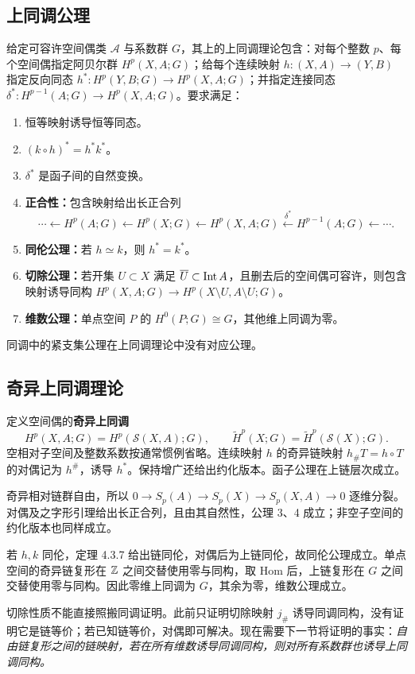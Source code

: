 \subsection*{上同调公理}
给定可容许空间偶类 $\mathcal A$ 与系数群 $G$，其上的上同调理论包含：对每个整数 $p$、每个空间偶指定阿贝尔群 $H^p(X,A;G)$；给每个连续映射 $h:(X,A)\to(Y,B)$ 指定反向同态 $h^*:H^p(Y,B;G)\to H^p(X,A;G)$；并指定连接同态 $\delta^*:H^{p-1}(A;G)\to H^p(X,A;G)$。要求满足：
\begin{enumerate}[label=公理 \arabic*.]
\item 恒等映射诱导恒等同态。
\item $(k\circ h)^*=h^*k^*$。
\item $\delta^*$ 是函子间的自然变换。
\item \textbf{正合性：}包含映射给出长正合列
\[
\cdots\leftarrow H^p(A;G)\leftarrow H^p(X;G)\leftarrow H^p(X,A;G)
\xleftarrow{\delta^*}H^{p-1}(A;G)\leftarrow\cdots.
\]
\item \textbf{同伦公理：}若 $h\simeq k$，则 $h^*=k^*$。
\item \textbf{切除公理：}若开集 $U\subset X$ 满足 $\overline U\subset\operatorname{Int} A$，且删去后的空间偶可容许，则包含映射诱导同构 $H^p(X,A;G)\to H^p(X\setminus U,A\setminus U;G)$。
\item \textbf{维数公理：}单点空间 $P$ 的 $H^0(P;G)\cong G$，其他维上同调为零。
\end{enumerate}
同调中的紧支集公理在上同调理论中没有对应公理。

\subsection*{奇异上同调理论}
定义空间偶的\textbf{奇异上同调}
\[
H^p(X,A;G)=H^p(\mathcal S(X,A);G),\qquad
\widetilde H^p(X;G)=\widetilde H^p(\mathcal S(X);G).
\]
空相对子空间及整数系数按通常惯例省略。连续映射 $h$ 的奇异链映射 $h_\#T=h\circ T$ 的对偶记为 $h^\#$，诱导 $h^*$。保持增广还给出约化版本。函子公理在上链层次成立。

奇异相对链群自由，所以 $0\to S_p(A)\to S_p(X)\to S_p(X,A)\to0$ 逐维分裂。对偶及之字形引理给出长正合列，且由其自然性，公理 3、4 成立；非空子空间的约化版本也同样成立。

若 $h,k$ 同伦，定理 4.3.7 给出链同伦，对偶后为上链同伦，故同伦公理成立。单点空间的奇异链复形在 $\mathbb{Z}$ 之间交替使用零与同构，取 Hom 后，上链复形在 $G$ 之间交替使用零与同构。因此零维上同调为 $G$，其余为零，维数公理成立。

切除性质不能直接照搬同调证明。此前只证明切除映射 $j_\#$ 诱导同调同构，没有证明它是链等价；若已知链等价，对偶即可解决。现在需要下一节将证明的事实：\emph{自由链复形之间的链映射，若在所有维数诱导同调同构，则对所有系数群也诱导上同调同构。}

